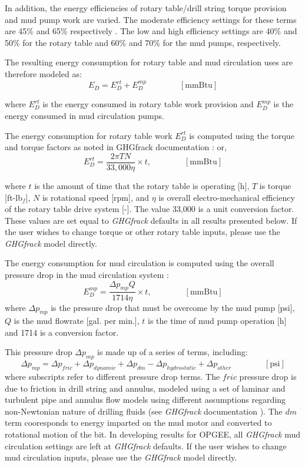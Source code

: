 \documentclass[11pt]{report}
\newcommand{\eqnunit}[1]{\quad\quad \scriptstyle{\left[\text{#1}\right]}}
\begin{document}
In addition, the energy efficiencies of rotary table/drill string torque provision and mud pump work are varied. The moderate efficiency settings for these terms are 45\% and 65\% respectively \cite{Vafi2016b}.  The low and high efficiency settings are 40\% and 50\% for the rotary table and 60\% and 70\% for the mud pumps, respectively.

The resulting energy consumption for rotary table and mud circulation uses are therefore modeled as:
\begin{equation}
E_{D} = E_{D}^{rt} + E_{D}^{mp} \quad\quad\eqnunit{mmBtu}
\end{equation}

where $E_{D}^{rt}$ is the energy consumed in rotary table work provision and $E_{D}^{mp}$ is the energy consumed in mud circulation pumps.

The energy consumption for rotary table work $E_{D}^{rt}$ is computed using the torque and torque factors as noted in GHGfrack documentation \cite{Vafi2016b}:
or,
\begin{equation}
E_{D}^{rt} = \frac{2 \pi T N}{33,000 \eta} \times t, \quad\quad\eqnunit{mmBtu}
\end{equation}

where $t$ is the amount of time that the rotary table is operating [h], $T$ is torque [ft-lb$_f$], $N$ is rotational speed [rpm], and $\eta$ is overall electro-mechanical efficiency of the rotary table drive system [-]. The value 33,000 is a unit conversion factor.  These values are set equal to \emph{GHGfrack} defaults in all results presented below. If the user wishes to change torque or other rotary table inputs, please use the \emph{GHGfrack} model directly. 

The energy consumption for mud circulation is computed using the overall pressure drop in the mud circulation system \cite{Vafi2016b}:
\begin{equation}
E_{D}^{mp} = \frac{\Delta p_{mp} Q}{1714 \eta} \times t, \quad\quad\eqnunit{mmBtu}
\end{equation}
where $\Delta p_{mp}$ is the pressure drop that must be overcome by the mud pump [psi], $Q$ is the mud flowrate [gal. per min.], $t$ is the time of mud pump operation [h] and 1714 is a conversion factor.

This pressure drop $\Delta p_{mp}$ is made up of a series of terms, including:
\begin{equation}
\Delta p_{mp} = \Delta p_{fric} + \Delta p_{dynamic} + \Delta p_{dm} - \Delta p_{hydrostatic} + \Delta p_{other} \quad\quad\eqnunit{psi}
\end{equation}
where subscripts refer to different pressure drop terms.  The $fric$ pressure drop is due to friction in drill string and annulus, modeled using a set of laminar and turbulent pipe and annulus flow models using different assumptions regarding non-Newtonian nature of drilling fluids (see \emph{GHGfrack} documentation \cite{Vafi2016a, Vafi2016b}).  The $dm$ term cooresponds to energy imparted on the mud motor and converted to rotational motion of the bit.  In developing results for OPGEE, all \emph{GHGfrack} mud circulation settings are left at \emph{GHGfrack} defaults. If the user wishes to change mud circulation inputs, please use the \emph{GHGfrack} model directly. 
\end{document}
